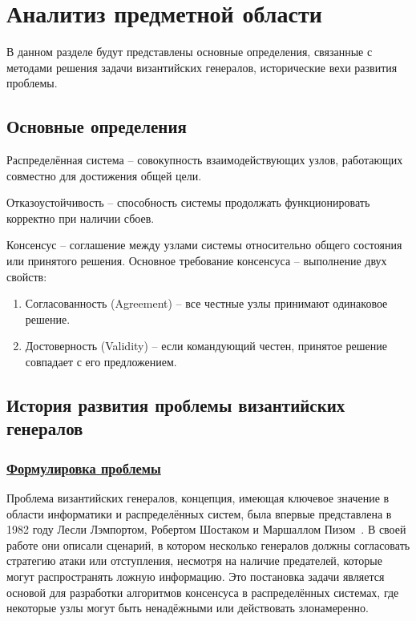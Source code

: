\section{Аналитиз предметной области}

\hspace{1.25cm}
В данном разделе будут представлены основные определения, связанные с методами решения задачи византийских генералов, исторические вехи развития проблемы.

\subsection{Основные определения}

\hspace{1.25cm}
Распределённая система -- совокупность взаимодействующих узлов, работающих совместно для достижения общей цели.

Отказоустойчивость -- способность системы продолжать функционировать корректно при наличии сбоев.

Консенсус -- соглашение между узлами системы относительно общего состояния или принятого решения. Основное требование консенсуса -- выполнение двух свойств:

\begin{enumerate}

\item Согласованность (Agreement) -- все честные узлы принимают одинаковое решение.

\item Достоверность (Validity) -- если командующий честен, принятое решение совпадает с его предложением.
\end{enumerate}


\subsection{История развития проблемы византийских генералов}

\subsubsection*{\underline{Формулировка проблемы}}

\hspace{1.25cm} Проблема византийских генералов, концепция, имеющая ключевое значение в области информатики и распределённых систем, была впервые представлена в 1982 году Лесли Лэмпортом, Робертом Шостаком и Маршаллом Пизом~\cite{lamport}. В своей работе они описали сценарий, в котором несколько генералов должны согласовать стратегию атаки или отступления, несмотря на наличие предателей, которые могут распространять ложную информацию. Это постановка задачи является основой для разработки алгоритмов консенсуса в распределённых системах, где некоторые узлы могут быть ненадёжными или действовать злонамеренно.

